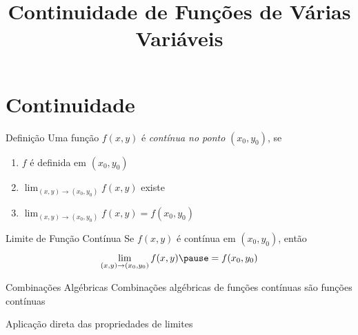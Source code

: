 
\usepackage{calculo_varias_variaveis-1}

\title {Continuidade de Funções de Várias Variáveis}



\addtitle

\section{Continuidade}

\begin{frame}{Definição}
  Uma função \(f(x, y)\) é \emph{contínua no ponto} $(x_0, y_0)$, se
  \begin{enumerate}[<+->]
    \setlength\itemsep{1em}
    \item $f$ é definida em \((x_0, y_0)\)
    \item \(\lim_{(x, y)\to(x_0, y_0)} f(x, y)\) existe
    \item \(\lim_{(x, y)\to(x_0, y_0)} f(x, y) = f(x_0, y_0)\)
  \end{enumerate}

  \vspace{\baselineskip}
\end{frame}

\begin{frame}{Limite de Função Contínua}
  Se \(f(x, y)\) é contínua em $(x_0, y_0)$,
  \pause
  então
  \[
    \lim_{(x, y)\to(x_0, y_0)} f(x, y) \pause = f(x_0, y_0)
  \]
\end{frame}

\begin{frame}{Combinações Algébricas}
  Combinações algébricas de funções contínuas são funções contínuas

  \pause
  \vspace{\baselineskip}
  Aplicação direta das propriedades de limites
\end{frame}

